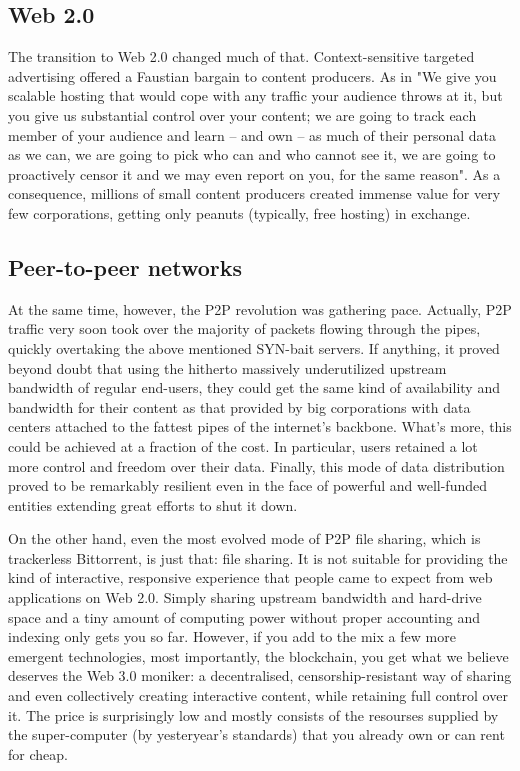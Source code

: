 \subsection{Web 2.0}

The transition to Web 2.0 changed much of that. Context-sensitive targeted advertising offered a Faustian bargain to content producers. As in "We give you scalable hosting that would cope with any traffic your audience throws at it, but you give us substantial control over your content; we are going to track each member of your audience and learn -- and own -- as much of their personal data as we can, we are going to pick who can and who cannot see it, we are going to proactively censor it and we may even report on you, for the same reason". As a consequence, millions of small content producers created immense value for very few corporations, getting only peanuts (typically, free hosting) in exchange.

\subsection{Peer-to-peer networks}

At the same time, however, the P2P revolution was gathering pace. Actually, P2P traffic very soon took over the majority of packets flowing through the pipes, quickly overtaking the above mentioned SYN-bait servers. If anything, it proved beyond doubt that using the hitherto massively underutilized upstream bandwidth of regular end-users, they could get the same kind of availability and bandwidth for their content as that provided by big corporations with data centers attached to the fattest pipes of the internet's backbone. What's more, this could be achieved at a fraction of the cost. In particular, users retained a lot more control and freedom over their data. Finally, this mode of data distribution proved to be remarkably resilient even in the face of powerful and well-funded entities extending great efforts to shut it down.


On the other hand, even the most evolved mode of P2P file sharing, which is trackerless Bittorrent, is just that: file sharing. It is not suitable for providing the kind of interactive, responsive experience that people came to expect from web applications on Web 2.0. Simply sharing upstream bandwidth and hard-drive space and a tiny amount of computing power without proper accounting and indexing only gets you so far. However, if you add to the mix a few more emergent technologies, most importantly, the blockchain, you get what we believe deserves the Web 3.0 moniker: a decentralised, censorship-resistant way of sharing and even collectively creating interactive content, while retaining full control over it. The price is surprisingly low and mostly consists of the resourses supplied by the super-computer (by yesteryear's standards) that you already own or can rent for cheap.

